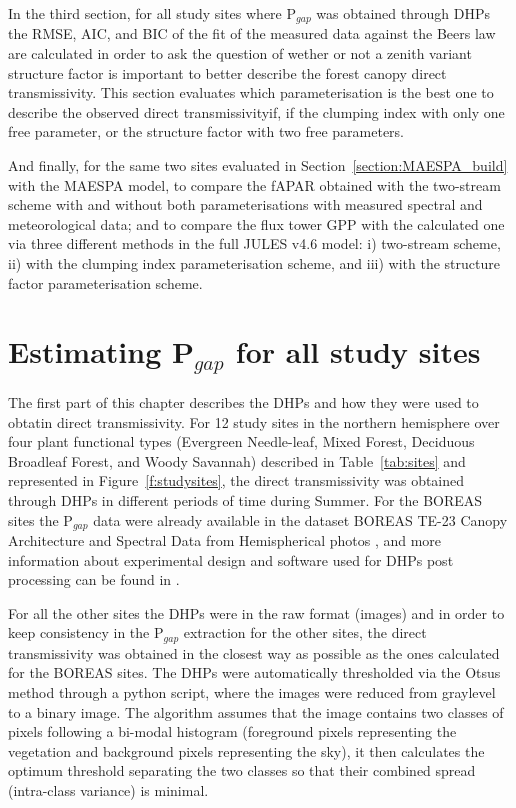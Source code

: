 \documentclass[a4paper,11pt]{report}
\begin{document}
In the third section, for all study sites where P$_{gap}$ was obtained through DHPs the RMSE, AIC, and BIC of the fit of the measured data against the Beer\textquotesingle s law are calculated in order to ask the question of wether or not a zenith variant structure factor is important to better describe the forest canopy direct transmissivity. This section evaluates which parameterisation is the best one to describe the observed direct transmissivityif, if the clumping index with only one free parameter, or the structure factor with two free parameters.

And finally, for the same two sites evaluated in Section~\ref{section:MAESPA_build} with the MAESPA model, to compare the fAPAR obtained with the two-stream scheme with and without both parameterisations with measured spectral and meteorological data; and to compare the flux tower GPP with the calculated one via three different methods in the full JULES v4.6 model: i) two-stream scheme, ii) with the clumping index parameterisation scheme, and iii) with the structure factor parameterisation scheme.

\section{Estimating P$_{gap}$ for all study sites}\label{section:hemiphotos}

The first part of this chapter describes the DHPs and how they were used to obtatin direct transmissivity. For 12 study sites in the northern hemisphere over four plant functional types (Evergreen Needle-leaf, Mixed Forest, Deciduous Broadleaf Forest, and Woody Savannah) described in Table~\ref{tab:sites} and represented in Figure~\ref{f:studysites}, the direct transmissivity was obtained through DHPs in different periods of time during Summer. For the BOREAS sites the P$_{gap}$ data were already available in the dataset BOREAS TE-23 Canopy Architecture and Spectral Data from Hemispherical photos \citep{Rich1999a}, and more information about experimental design and software used for DHPs post processing can be found in \citet{chen1997}.

For all the other sites the DHPs were in the raw format (images) and in order to keep consistency in the P$_{gap}$ extraction for the other sites, the direct transmissivity was obtained in the closest way as possible as the ones calculated for the BOREAS sites. The DHPs were automatically thresholded via the Otsu\textquotesingle s method \citep{Otsu1979} through a python script, where the images were reduced from graylevel to a binary image. The algorithm assumes that the image contains two classes of pixels following a bi-modal histogram (foreground pixels representing the vegetation and background pixels representing the sky), it then calculates the optimum threshold separating the two classes so that their combined spread (intra-class variance) is minimal.
\end{document}
